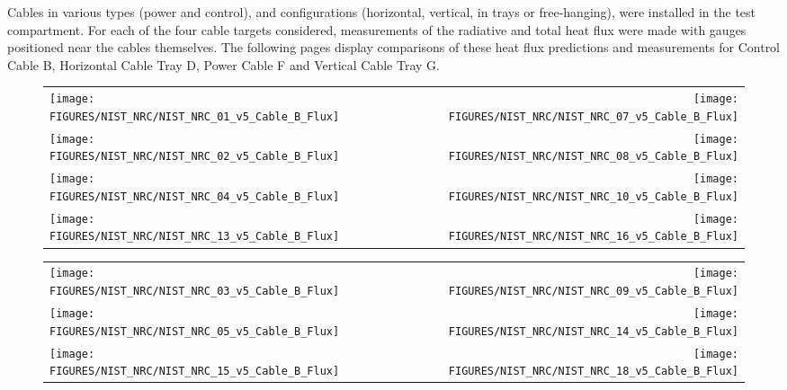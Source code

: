 Cables in various types (power and control), and configurations (horizontal, vertical, in trays or free-hanging), were installed in
the test compartment. For each of the four cable targets considered, measurements of the radiative and total heat flux were made with
gauges positioned near the cables themselves.  The following pages display comparisons of these heat flux predictions and measurements for
Control Cable B, Horizontal Cable Tray D, Power Cable F and Vertical Cable Tray G.

\begin{figure}[p]
\begin{tabular*}{\textwidth}{l@{\extracolsep{\fill}}r}
\texttt{[image: FIGURES/NIST\_NRC/NIST\_NRC\_01\_v5\_Cable\_B\_Flux]} &
\texttt{[image: FIGURES/NIST\_NRC/NIST\_NRC\_07\_v5\_Cable\_B\_Flux]} \\
\texttt{[image: FIGURES/NIST\_NRC/NIST\_NRC\_02\_v5\_Cable\_B\_Flux]} &
\texttt{[image: FIGURES/NIST\_NRC/NIST\_NRC\_08\_v5\_Cable\_B\_Flux]} \\
\texttt{[image: FIGURES/NIST\_NRC/NIST\_NRC\_04\_v5\_Cable\_B\_Flux]} &
\texttt{[image: FIGURES/NIST\_NRC/NIST\_NRC\_10\_v5\_Cable\_B\_Flux]} \\
\texttt{[image: FIGURES/NIST\_NRC/NIST\_NRC\_13\_v5\_Cable\_B\_Flux]} &
\texttt{[image: FIGURES/NIST\_NRC/NIST\_NRC\_16\_v5\_Cable\_B\_Flux]}
\end{tabular*}
\label{NIST_NRC_Cable_B_Flux_Closed}
\end{figure}

\begin{figure}[p]
\begin{tabular*}{\textwidth}{l@{\extracolsep{\fill}}r}
\texttt{[image: FIGURES/NIST\_NRC/NIST\_NRC\_03\_v5\_Cable\_B\_Flux]} &
\texttt{[image: FIGURES/NIST\_NRC/NIST\_NRC\_09\_v5\_Cable\_B\_Flux]} \\
\texttt{[image: FIGURES/NIST\_NRC/NIST\_NRC\_05\_v5\_Cable\_B\_Flux]} &
\texttt{[image: FIGURES/NIST\_NRC/NIST\_NRC\_14\_v5\_Cable\_B\_Flux]} \\
\texttt{[image: FIGURES/NIST\_NRC/NIST\_NRC\_15\_v5\_Cable\_B\_Flux]} &
\texttt{[image: FIGURES/NIST\_NRC/NIST\_NRC\_18\_v5\_Cable\_B\_Flux]}
\end{tabular*}
\label{NIST_NRC_Cable_B_Flux_Open}
\end{figure}

